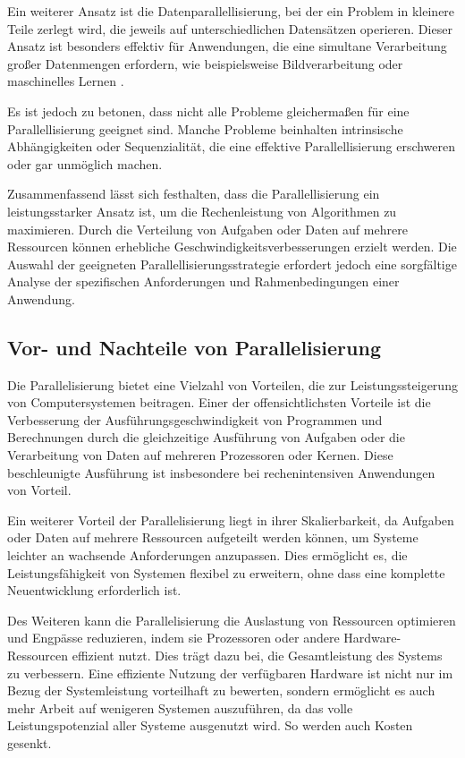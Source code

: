 Ein weiterer Ansatz ist die Datenparallellisierung, bei der ein Problem in kleinere Teile zerlegt wird, die jeweils auf unterschiedlichen Datensätzen operieren. Dieser Ansatz ist besonders effektiv für Anwendungen, die eine simultane Verarbeitung großer Datenmengen erfordern, wie beispielsweise Bildverarbeitung oder maschinelles Lernen \citep{Flynn_Computer_Organizations_and_their_Effectiveness}.

Es ist jedoch zu betonen, dass nicht alle Probleme gleichermaßen für eine Parallellisierung geeignet sind. Manche Probleme beinhalten intrinsische Abhängigkeiten oder Sequenzialität, die eine effektive Parallellisierung erschweren oder gar unmöglich machen.

Zusammenfassend lässt sich festhalten, dass die Parallellisierung ein leistungsstarker Ansatz ist, um die Rechenleistung von Algorithmen zu maximieren. Durch die Verteilung von Aufgaben oder Daten auf mehrere Ressourcen können erhebliche Geschwindigkeitsverbesserungen erzielt werden. Die Auswahl der geeigneten Parallellisierungsstrategie erfordert jedoch eine sorgfältige Analyse der spezifischen Anforderungen und Rahmenbedingungen einer Anwendung.

\subsection{Vor- und Nachteile von Parallelisierung}
\label{sec:Grundlagen_Parallelisierung_Vorteile_Nachteile}
Die Parallelisierung bietet eine Vielzahl von Vorteilen, die zur Leistungssteigerung von Computersystemen beitragen. Einer der offensichtlichsten Vorteile ist die Verbesserung der Ausführungsgeschwindigkeit von Programmen und Berechnungen durch die gleichzeitige Ausführung von Aufgaben oder die Verarbeitung von Daten auf mehreren Prozessoren oder Kernen. Diese beschleunigte Ausführung ist insbesondere bei rechenintensiven Anwendungen von Vorteil.

Ein weiterer Vorteil der Parallelisierung liegt in ihrer Skalierbarkeit, da Aufgaben oder Daten auf mehrere Ressourcen aufgeteilt werden können, um Systeme leichter an wachsende Anforderungen anzupassen. Dies ermöglicht es, die Leistungsfähigkeit von Systemen flexibel zu erweitern, ohne dass eine komplette Neuentwicklung erforderlich ist.

Des Weiteren kann die Parallelisierung die Auslastung von Ressourcen optimieren und Engpässe reduzieren, indem sie Prozessoren oder andere Hardware-Ressourcen effizient nutzt. Dies trägt dazu bei, die Gesamtleistung des Systems zu verbessern. Eine effiziente Nutzung der verfügbaren Hardware ist nicht nur im Bezug der Systemleistung vorteilhaft zu bewerten, sondern ermöglicht es auch mehr Arbeit auf wenigeren Systemen auszuführen, da das volle Leistungspotenzial aller Systeme ausgenutzt wird. So werden auch Kosten gesenkt.


